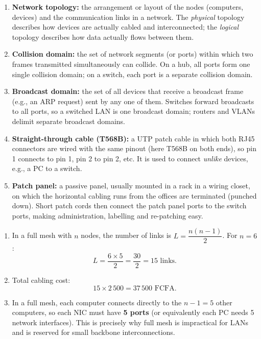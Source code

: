 \documentclass[11pt]{article}
\begin{document}
\begin{corrige}
\begin{enumerate}
\item \textbf{Network topology:} the arrangement or layout of the nodes (computers, devices) and the communication links in a network. The \emph{physical} topology describes how devices are actually cabled and interconnected; the \emph{logical} topology describes how data actually flows between them.
\item \textbf{Collision domain:} the set of network segments (or ports) within which two frames transmitted simultaneously can collide. On a hub, all ports form one single collision domain; on a switch, each port is a separate collision domain.
\item \textbf{Broadcast domain:} the set of all devices that receive a broadcast frame (e.g., an ARP request) sent by any one of them. Switches forward broadcasts to all ports, so a switched LAN is one broadcast domain; routers and VLANs delimit separate broadcast domains.
\item \textbf{Straight-through cable (T568B):} a UTP patch cable in which both RJ45 connectors are wired with the same pinout (here T568B on both ends), so pin 1 connects to pin 1, pin 2 to pin 2, etc. It is used to connect \emph{unlike} devices, e.g., a PC to a switch.
\item \textbf{Patch panel:} a passive panel, usually mounted in a rack in a wiring closet, on which the horizontal cabling runs from the offices are terminated (punched down). Short patch cords then connect the patch panel ports to the switch ports, making administration, labelling and re-patching easy.
\end{enumerate}
\end{corrige}

\begin{corrige}
\begin{enumerate}
\item In a full mesh with $n$ nodes, the number of links is $L = \dfrac{n(n-1)}{2}$. For $n=6$:
\[ L = \frac{6 \times 5}{2} = \frac{30}{2} = 15 \text{ links.} \]
\item Total cabling cost:
\[ 15 \times 2\,500 = 37\,500 \text{ FCFA.} \]
\item In a full mesh, each computer connects directly to the $n-1 = 5$ other computers, so each NIC must have \textbf{5 ports} (or equivalently each PC needs 5 network interfaces). This is precisely why full mesh is impractical for LANs and is reserved for small backbone interconnections.
\end{enumerate}
\end{corrige}
\end{document}
